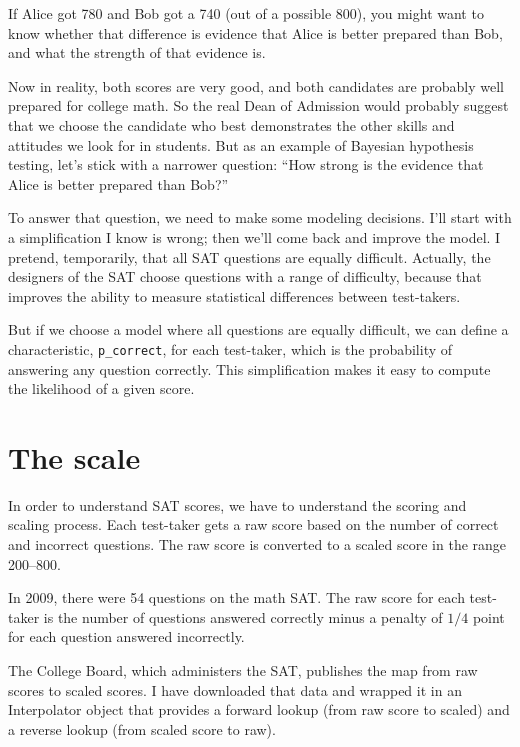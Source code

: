 \documentclass[12pt]{book}
\begin{document}
If Alice got 780 and Bob got a 740 (out of a possible 800), you might
want to know whether that difference is evidence that Alice is better
prepared than Bob, and what the strength of that evidence is.

Now in reality, both scores are very good, and both 
candidates are probably well prepared for college math.  So
the real Dean of Admission would probably suggest that we choose
the candidate who best demonstrates the other skills and
attitudes we look for in students.  But as an example of
Bayesian hypothesis testing, let's stick with a narrower question:
``How strong is the evidence that Alice is better prepared
than Bob?''

To answer that question, we need to make some modeling decisions.
I'll start with a simplification I know is wrong; then we'll come back
and improve the model.  I pretend, temporarily, that
all SAT questions are equally difficult.  Actually, the designers of
the SAT choose questions with a range of difficulty, because that
improves the ability to measure statistical differences between
test-takers.

But if we choose a model where all questions are equally difficult, we
can define a characteristic, \verb"p_correct", for each test-taker,
which is the probability of answering any question correctly.  This
simplification makes it easy to compute the likelihood of a given
score.


\section{The scale}

In order to understand SAT scores, we have to understand the scoring
and scaling process.  Each test-taker gets a raw score based on the
number of correct and incorrect questions.  The raw score is converted
to a scaled score in the range 200--800.

In 2009, there were 54 questions on the math SAT.  The raw score
for each test-taker is the number of questions answered correctly
minus a penalty of $1/4$ point for each question answered incorrectly.

The College Board, which administers the SAT, publishes the
map from raw scores to scaled scores.  I have downloaded that
data and wrapped it in an Interpolator object that provides a forward
lookup (from raw score to scaled) and a reverse lookup (from scaled
score to raw).
\end{document}
